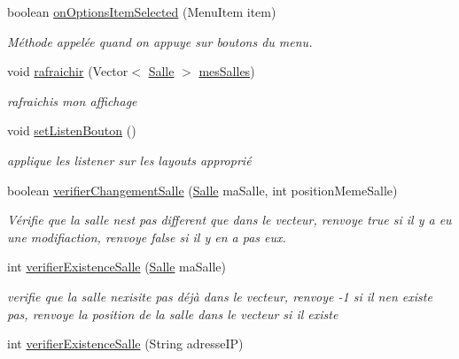 \begin{DoxyCompactItemize}
boolean \hyperlink{classcom_1_1lasalle_1_1meeting_1_1_main_activity_aa75ab3607c240fd26857f7eb6314e8bb}{on\+Options\+Item\+Selected} (Menu\+Item item)
\begin{DoxyCompactList}\small\item\em Méthode appelée quand on appuye sur boutons du menu. \end{DoxyCompactList}\item 
void \hyperlink{classcom_1_1lasalle_1_1meeting_1_1_main_activity_a58c77ea2af56877f661e85dcfd3f1299}{rafraichir} (Vector$<$ \hyperlink{classcom_1_1lasalle_1_1meeting_1_1_salle}{Salle} $>$ \hyperlink{classcom_1_1lasalle_1_1meeting_1_1_main_activity_ab13e34516d877abc3ba937505b441979}{mes\+Salles})
\begin{DoxyCompactList}\small\item\em rafraichis mon affichage \end{DoxyCompactList}\item 
void \hyperlink{classcom_1_1lasalle_1_1meeting_1_1_main_activity_a6bd5bed490e4679df4c4edbb0ce9a4cc}{set\+Listen\+Bouton} ()
\begin{DoxyCompactList}\small\item\em applique les listener sur les layouts approprié \end{DoxyCompactList}\item 
boolean \hyperlink{classcom_1_1lasalle_1_1meeting_1_1_main_activity_a1502e68ede2683ced61843887ca63963}{verifier\+Changement\+Salle} (\hyperlink{classcom_1_1lasalle_1_1meeting_1_1_salle}{Salle} ma\+Salle, int position\+Meme\+Salle)
\begin{DoxyCompactList}\small\item\em Vérifie que la salle n\textquotesingle{}est pas different que dans le vecteur, r\textquotesingle{}envoye true si il y a eu une modifiaction, r\textquotesingle{}envoye false si il y en a pas eux. \end{DoxyCompactList}\item 
int \hyperlink{classcom_1_1lasalle_1_1meeting_1_1_main_activity_ad0924169264a808e34a20c406efe0db2}{verifier\+Existence\+Salle} (\hyperlink{classcom_1_1lasalle_1_1meeting_1_1_salle}{Salle} ma\+Salle)
\begin{DoxyCompactList}\small\item\em verifie que la salle n\textquotesingle{}exisite pas déjà dans le vecteur, r\textquotesingle{}envoye -\/1 si il n\textquotesingle{}en existe pas, r\textquotesingle{}envoye la position de la salle dans le vecteur si il existe \end{DoxyCompactList}\item 
int \hyperlink{classcom_1_1lasalle_1_1meeting_1_1_main_activity_ac505af5465f0d95b1232acb745c86a08}{verifier\+Existence\+Salle} (String adresse\+IP)
\end{DoxyCompactItemize}
